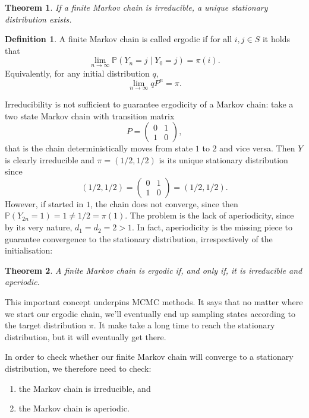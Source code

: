 \documentclass[
]{book}
\newtheorem{theorem}{Theorem}[chapter]
\theoremstyle{definition}
\newtheorem{definition}{Definition}[chapter]
\theoremstyle{definition}
\theoremstyle{definition}
\theoremstyle{definition}
\theoremstyle{remark}
\begin{document}
\begin{theorem}
If a finite Markov chain is irreducible, a unique stationary distribution exists.
\end{theorem}

\begin{definition}
A finite Markov chain is called ergodic if for all \(i,j \in S\) it holds that
\[\lim_{n \to \infty} \mathbb{P}(Y_n = j \mid Y_0 = j) = \pi(i).\]
Equivalently, for any initial distribution \(q\),
\[\lim_{n \to \infty} qP^n = \pi.\]
\end{definition}

Irreducibility is not sufficient to guarantee ergodicity of a Markov chain: take a two state Markov chain with transition matrix
\[P = \begin{pmatrix} 0 & 1\\ 1 & 0 \end{pmatrix},\]
that is the chain deterministically moves from state \(1\) to \(2\) and vice versa. Then \(Y\) is clearly irreducible and \(\pi = (1/2,1/2)\) is its unique stationary distribution since\\
\[(1/2, 1/2) =  \begin{pmatrix} 0 & 1\\ 1 & 0 \end{pmatrix} = (1/2,1/2).\]
However, if started in \(1\), the chain does not converge, since then \(\mathbb{P}(Y_{2n} = 1) = 1 \neq 1/2 = \pi(1).\) The problem is the lack of aperiodicity, since by its very nature, \(d_1 = d_2 = 2 > 1\). In fact, aperiodicity is the missing piece to guarantee convergence to the stationary distribution, irrespectively of the initialisation:

\begin{theorem}
A finite Markov chain is ergodic if, and only if, it is irreducible and aperiodic.
\end{theorem}

This important concept underpins MCMC methods. It says that no matter where we start our ergodic chain, we'll eventually end up sampling states according to the target distribution \(\pi\). It make take a long time to reach the stationary distribution, but it will eventually get there.

In order to check whether our finite Markov chain will converge to a stationary distribution, we therefore need to check:

\begin{enumerate}
\def\labelenumi{\arabic{enumi}.}
\item
  the Markov chain is irreducible, and
\item
  the Markov chain is aperiodic.
\end{enumerate}
\end{document}
